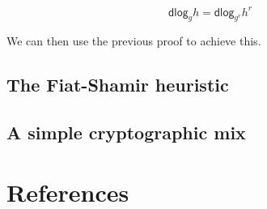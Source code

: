 \documentclass[11pt,twoside,a4paper]{article}
\newcommand{\dlog}{\mathsf{dlog}}
\theoremstyle{definition}
\begin{document}
\[\dlog_g{h}=\dlog_{g^r}{h^r}\]

We can then use the previous proof to achieve this.
\subsection{The Fiat-Shamir heuristic}
\subsection{A simple cryptographic mix}
\vfill\pagebreak
\section{References}


\end{document}

